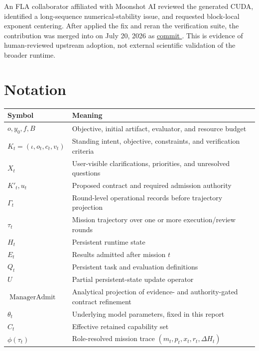 An FLA collaborator affiliated with Moonshot AI reviewed the generated CUDA,
identified a long-sequence numerical-stability issue, and requested block-local
exponent centering. After \systemname applied the fix and reran the verification
suite, the contribution was merged into  on July 20, 2026 as
\href{https://github.com/fla-org/flash-linear-attention/commit/c70f11c5530142450525549cc96d13d9f5165f69}
{commit }. This is evidence of human-reviewed upstream adoption,
not external scientific validation of the broader runtime.

\section{Notation}

\begin{table}[H]
\centering
\footnotesize
\begin{tabularx}{0.88\linewidth}{@{}p{2.6cm} X@{}}
\toprule
\rowcolor{papersand}
\textbf{Symbol} & \textbf{Meaning} \\
\midrule
$o,y_0,f,B$ & Objective, initial artifact, evaluator, and resource budget \\
$K_t=(\iota,o_t,c_t,v_t)$ & Standing intent, objective, constraints, and verification criteria \\
$X_t$ & User-visible clarifications, priorities, and unresolved questions \\
$K'_t,u_t$ & Proposed contract and required admission authority \\
$\Gamma_t$ & Round-level operational records before trajectory projection \\
$\tau_t$ & Mission trajectory over one or more execution/review rounds \\
$H_t$ & Persistent runtime state \\
$E_t$ & Results admitted after mission $t$ \\
$Q_t$ & Persistent task and evaluation definitions \\
$U$ & Partial persistent-state update operator \\
$\operatorname{ManagerAdmit}$ & Analytical projection of evidence- and authority-gated contract refinement \\
$\theta_t$ & Underlying model parameters, fixed in this report \\
$C_t$ & Effective retained capability set \\
$\phi(\tau_t)$ & Role-resolved mission trace $(m_t,p_t,x_t,r_t,\Delta H_t)$ \\

\end{tabularx}
\end{table}

